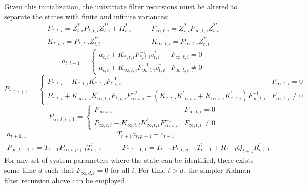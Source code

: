 \documentclass[12pt]{article}
\begin{document}
	Given this initialization, the univariate filter recursions must be altered to separate the states with finite and infinite variances: 
	\begin{align*}
	 F_{*,t,i} = Z_{t,i}^* P_{*,t,i} Z_{t,i}^{*\prime} + H_{t,i}^* &\qquad F_{\infty,t,i} = Z_{t,i}^* P_{\infty,t,i} Z_{t,i}^{*\prime}\\
	K_{*,t,i} = P_{*,t,i} Z_{t,i}^{*\prime} &\qquad K_{\infty,t,i} = P_{\infty,t,i} Z_{t,i}^{*\prime} 
	\end{align*}
	\begin{equation*}
	a_{t,i+1} = \begin{cases} 
	      a_{t,i} + K_{*,t,i} F_{*,t,i}^{-1} v_{t,i}^* & F_{\infty,t,i} = 0 \\
	      a_{t,i} + K_{\infty,t,i} F_{\infty,t,i}^{-1} v_{t,i}^* & F_{\infty,t,i} \neq 0
    \end{cases} 
    \end{equation*}
	\begin{equation*}
	P_{*,t,i+1} = \begin{cases} 
	   P_{*,t,i} - K_{*,t,i} K_{*,t,i}^\prime F_{*,t,i}^{-1} & F_{\infty,t,i} = 0 \\
	   P_{*,t,i} + K_{\infty,t,i} K_{\infty,t,i}^\prime F_{*,t,i} F_{\infty,t,i}^{-2} - (K_{*,t,i} K_{\infty,t,i}^\prime + K_{\infty,t,i} K_{*,t,i}^\prime) F_{\infty,t,i}^{-1} & F_{\infty,t,i} \neq 0
	\end{cases}
	\end{equation*}
	\begin{equation*}
	P_{\infty,t,i+1} = \begin{cases} 
	   P_{\infty,t,i} & F_{\infty,t,i} = 0 \\
	   P_{\infty,t,i} - K_{\infty,t,i} K_{\infty,t,i}^\prime F_{\infty,t,i}^{-1} & F_{\infty,t,i} \neq 0	   
	\end{cases} 
	\end{equation*}
	\begin{align*}
	a_{t+1,1} &= T_{t+1} a_{t, p+1} + c_{t+1} \\
	P_{\infty,t+1,1} = T_{t+1} P_{\infty,t,p+1} T_{t+1}^\prime &\qquad P_{*,t+1,1} = T_{t+1} P_{*,t,p+1} T_{t+1}^\prime + R_{t+1} Q_{t+1} R_{t+1}^\prime 
	\end{align*}
	For any set of system parameters where the state can be identified, there exists some time $d$ such that $F_{\infty,d,i} = 0$ for all $i$. For time $t > d$, the simpler Kalman filter recursion above can be employed. \\
\end{document}
